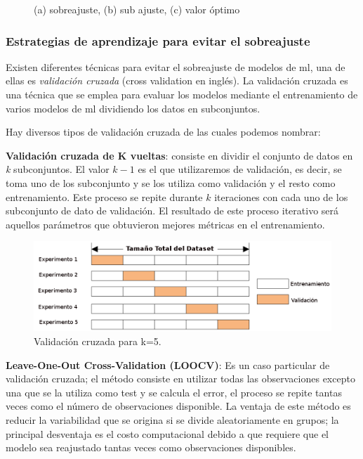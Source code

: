 \begin{figure}[htbp]
\centering
{}
\caption{(a) sobreajuste, (b) sub ajuste, (c) valor óptimo}\label{Fig:overUnder}
\end{figure}


\subsubsection{Estrategias de aprendizaje para evitar el sobreajuste}

Existen diferentes técnicas para evitar el sobreajuste de modelos de \ac{ml}, una de ellas es \textit{validación cruzada} (cross validation en inglés). La validación cruzada es una técnica que se emplea para evaluar los modelos mediante el entrenamiento de varios modelos de  \ac{ml} dividiendo los datos en subconjuntos.

Hay diversos tipos de validación cruzada de las cuales podemos nombrar:


\par \textbf{Validación cruzada de K vueltas}: consiste en dividir el conjunto de datos en \textit{k} subconjuntos. El valor $k-1 $ es el que utilizaremos de validación, es decir, se toma uno de los subconjunto y se los utiliza como validación y el resto como entrenamiento.  Este proceso se repite durante $k $ iteraciones con cada uno de los subconjunto de dato de validación. El resultado de este proceso iterativo será aquellos parámetros que obtuvieron mejores métricas en el entrenamiento.
\begin{figure}[H]
 \centering
  \includegraphics[scale=0.4,keepaspectratio=true,clip=true]{imagenes/MarcoTeorico/crossvalidat.png}
  \caption{Validación cruzada para k=5.}%
	\label{Fig: crossvalidation}
\end{figure}

\par \textbf{Leave-One-Out Cross-Validation (LOOCV)}: Es un caso particular de validación cruzada; el método consiste en utilizar todas las observaciones excepto una que se la utiliza como test y se calcula el error, el proceso se repite tantas veces como el número de observaciones disponible. La ventaja de este método es reducir la variabilidad que se origina si se divide aleatoriamente en grupos; la principal desventaja es el costo computacional debido a que requiere que el modelo sea reajustado tantas veces como observaciones disponibles.

